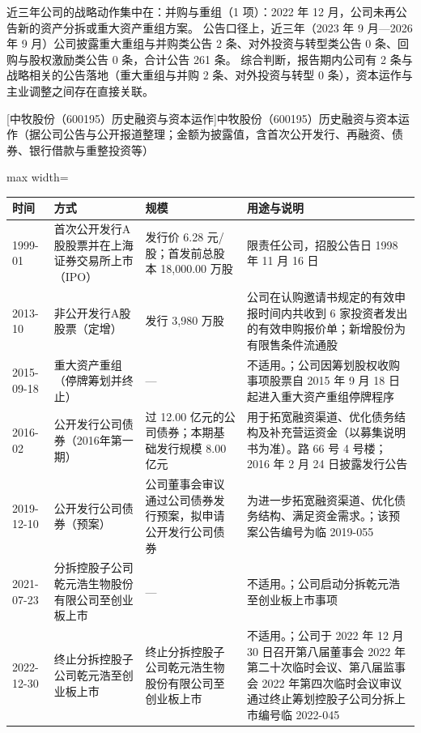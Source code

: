 近三年公司的战略动作集中在：并购与重组（1 项）：2022 年 12 月，公司未再公告新的资产分拆或重大资产重组方案。 公告口径上，近三年（2023 年 9 月---2026 年 9 月）公司披露重大重组与并购类公告 2 条、对外投资与转型类公告 0 条、回购与股权激励类公告 0 条，合计公告 261 条。 综合判断，报告期内公司有 2 条与战略相关的公告落地（重大重组与并购 2 条、对外投资与转型 0 条），资本运作与主业调整之间存在直接关联。

\begin{center}\small\setlength{\tabcolsep}{4pt}
[中牧股份（600195）历史融资与资本运作]{中牧股份（600195）历史融资与资本运作（据公司公告与公开报道整理；金额为披露值，含首次公开发行、再融资、债券、银行借款与重整投资等）}
\begin{adjustbox}{max width=\textwidth}
\begin{tabular}{@{}p{1.45cm}p{2.55cm}p{4.05cm}p{4.95cm}@{}}
\toprule
时间 & 方式 & 规模 & 用途与说明 \\
\midrule
1999-01 & 首次公开发行A股股票并在上海证券交易所上市（IPO） & 发行价 6.28 元/\allowbreak{}股；首发前总股本 18,\allowbreak{}000.00 万股 & 限责任公司，\allowbreak{}招股公告日 1998 年 11 月 16 日 \\
2013-10 & 非公开发行A股股票（定增） & 发行 3,\allowbreak{}980 万股 & 公司在认购邀请书规定的有效申报时间内共收到 6 家投资者发出的有效申购报价单；新增股份为有限售条件流通股 \\
2015-09-18 & 重大资产重组（停牌筹划并终止） & --- & 不适用。；公司因筹划股权收购事项股票自 2015 年 9 月 18 日起进入重大资产重组停牌程序 \\
2016-02 & 公开发行公司债券（2016年第一期） & 过 12.00 亿元的公司债券；本期基础发行规模 8.00 亿元 & 用于拓宽融资渠道、\allowbreak{}优化债务结构及补充营运资金（以募集说明书为准）。路 66 号 4 号楼；2016 年 2 月 24 日披露发行公告 \\
2019-12-10 & 公开发行公司债券（预案） & 公司董事会审议通过公司债券发行预案，\allowbreak{}拟申请公开发行公司债券 & 为进一步拓宽融资渠道、\allowbreak{}优化债务结构、\allowbreak{}满足资金需求。；该预案公告编号为临 2019-055 \\
2021-07-23 & 分拆控股子公司乾元浩生物股份有限公司至创业板上市 & --- & 不适用。；公司启动分拆乾元浩至创业板上市事项 \\
2022-12-30 & 终止分拆控股子公司乾元浩至创业板上市 & 终止分拆控股子公司乾元浩生物股份有限公司至创业板上市 & 不适用。；公司于 2022 年 12 月 30 日召开第八届董事会 2022 年第二十次临时会议、\allowbreak{}第八届监事会 2022 年第四次临时会议审议通过终止筹划控股子公司分拆上市编号临 2022-045 \\
\bottomrule
\end{tabular}
\end{adjustbox}
\end{center}

